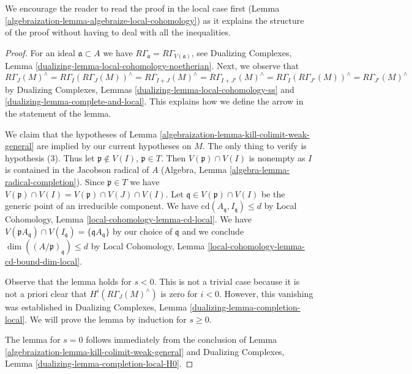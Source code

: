 We encourage the reader to read the proof in the local case first
(Lemma \ref{algebraization-lemma-algebraize-local-cohomology}) as it explains the structure
of the proof without having to deal with all the inequalities.

\begin{proof}

For an ideal $\mathfrak a \subset A$ we have
$R\Gamma_\mathfrak a = R\Gamma_{V(\mathfrak a)}$, see
Dualizing Complexes, Lemma \ref{dualizing-lemma-local-cohomology-noetherian}.
Next, we observe that
$$
R\Gamma_J(M)^\wedge =
R\Gamma_I(R\Gamma_J(M))^\wedge =
R\Gamma_{I + J}(M)^\wedge =
R\Gamma_{I + J'}(M)^\wedge =
R\Gamma_I(R\Gamma_{J'}(M))^\wedge =
R\Gamma_{J'}(M)^\wedge
$$
by Dualizing Complexes, Lemmas \ref{dualizing-lemma-local-cohomology-ss} and
\ref{dualizing-lemma-complete-and-local}.
This explains how we define the arrow in the statement of the lemma.

\medskip\noindent
We claim that the hypotheses of Lemma \ref{algebraization-lemma-kill-colimit-weak-general}
are implied by our current hypotheses on $M$.
The only thing to verify is hypothesis (3).
Thus let $\mathfrak p \not \in V(I)$, $\mathfrak p \in T$.
Then $V(\mathfrak p) \cap V(I)$ is nonempty as $I$ is
contained in the Jacobson radical of $A$
(Algebra, Lemma \ref{algebra-lemma-radical-completion}).
Since $\mathfrak p \in T$ we have
$V(\mathfrak p) \cap V(I) = V(\mathfrak p) \cap V(J) \cap V(I)$.
Let $\mathfrak q \in V(\mathfrak p) \cap V(I)$ be the
generic point of an irreducible component.
We have $\text{cd}(A_\mathfrak q, I_\mathfrak q) \leq d$
by Local Cohomology, Lemma \ref{local-cohomology-lemma-cd-local}.
We have $V(\mathfrak pA_\mathfrak q) \cap V(I_\mathfrak q) =
\{\mathfrak qA_\mathfrak q\}$ by our choice of $\mathfrak q$
and we conclude $\dim((A/\mathfrak p)_\mathfrak q) \leq d$
by Local Cohomology, Lemma \ref{local-cohomology-lemma-cd-bound-dim-local}.

\medskip\noindent
Observe that the lemma holds for $s < 0$. This is not a trivial case because
it is not a priori clear that $H^i(R\Gamma_J(M)^\wedge)$
is zero for $i < 0$. However, this vanishing was established in
Dualizing Complexes, Lemma \ref{dualizing-lemma-completion-local}.
We will prove the lemma by induction for $s \geq 0$.

\medskip\noindent
The lemma for $s = 0$ follows immediately from
the conclusion of Lemma \ref{algebraization-lemma-kill-colimit-weak-general}
and Dualizing Complexes, Lemma \ref{dualizing-lemma-completion-local-H0}.


\end{proof}
